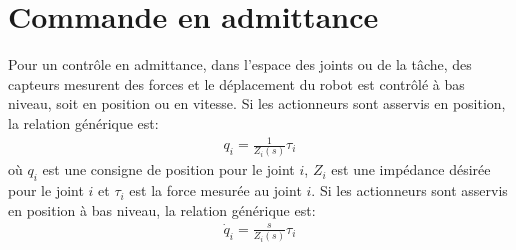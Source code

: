 

\section{Commande en admittance}

Pour un contrôle en admittance, dans l'espace des joints ou de la tâche, des capteurs mesurent des forces et le déplacement du robot est contrôlé à bas niveau, soit en position ou en vitesse. Si les actionneurs sont asservis en position, la relation générique est:
\begin{align}
q_i = \frac{1}{Z_i(s)} \tau_i
\label{eq:admipos}
\end{align}
où $q_i$ est une consigne de position pour le joint $i$, $Z_i$ est une impédance désirée pour le joint $i$ et $\tau_i$ est la force mesurée au joint $i$.
Si les actionneurs sont asservis en position à bas niveau, la relation générique est:
\begin{align}
\dot{q}_i = \frac{s}{Z_i(s)} \tau_i
\label{eq:admispeed}
\end{align}

